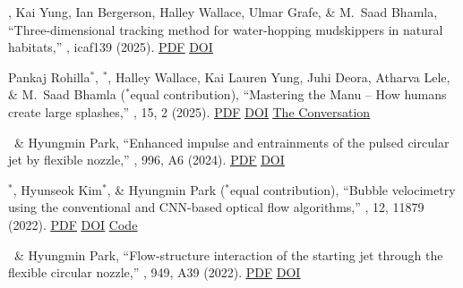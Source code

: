 \begin{pubSubsectionNum}

  \item \daehyunchoi, Kai Yung, Ian Bergerson, Halley Wallace, Ulmar Grafe,
        \& M.\ Saad Bhamla,
        ``Three-dimensional tracking method for water-hopping mudskippers
        in natural habitats,''
        \icb, icaf139 \textcolor{BrickRed}{(2025)}.
        \ifshowcontent
          \href{https://dae416.github.io/papers/choi2025_icb.pdf}{\underline{PDF}} \href{https://doi.org/10.1093/icb/icaf139}{\underline{DOI}}
        \fi

  \item Pankaj Rohilla$^\ast$, \daehyunchoi$^\ast$, Halley Wallace, Kai Lauren Yung,
        Juhi Deora, Atharva Lele, \& M.\ Saad Bhamla ($^\ast$equal contribution),
        ``Mastering the Manu -- How humans create large splashes,''
        \jrsi, 15, 2 \textcolor{BrickRed}{(2025)}.
        \ifshowcontent
          \href{https://dae416.github.io/papers/rohilla2025_jrsi.pdf}{\underline{PDF}} \href{https://doi.org/10.1098/rsfs.2024.0056}{\underline{DOI}} \href{https://theconversation.com/manu-jumping-the-physics-behind-making-humongous-splashes-in-the-pool-255837}{\underline{The Conversation}}
        \fi

  \item \daehyunchoi\ \& Hyungmin Park,
        ``Enhanced impulse and entrainments of the pulsed circular jet by flexible nozzle,''
        \jfm, 996, A6 \textcolor{BrickRed}{(2024)}.
        \ifshowcontent
          \href{https://dae416.github.io/papers/choi2024_jfm.pdf}{\underline{PDF}} \href{https://doi.org/10.1017/jfm.2024.720}{\underline{DOI}}
        \fi

  \item \daehyunchoi$^\ast$, Hyunseok Kim$^\ast$, \& Hyungmin Park ($^\ast$equal contribution),
        ``Bubble velocimetry using the conventional and CNN-based optical flow algorithms,''
        \srep, 12, 11879 \textcolor{BrickRed}{(2022)}.
        \ifshowcontent
          \href{https://dae416.github.io/papers/choi2022_srep.pdf}{\underline{PDF}} \href{https://doi.org/10.1038/s41598-022-16145-y}{\underline{DOI}} \href{https://github.com/dae416/DeepBubbleVelocimetry}{\underline{Code}}
        \fi

  \item \daehyunchoi\ \& Hyungmin Park,
        ``Flow-structure interaction of the starting jet through the flexible circular nozzle,''
        \jfm, 949, A39 \textcolor{BrickRed}{(2022)}.
        \ifshowcontent
          \href{https://dae416.github.io/papers/choi2022b_jfm.pdf}{\underline{PDF}} \href{https://doi.org/10.1017/jfm.2022.781}{\underline{DOI}}
        \fi


\end{pubSubsectionNum}
